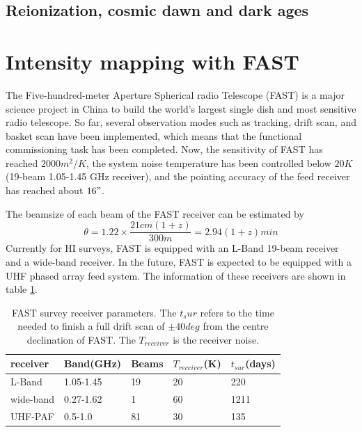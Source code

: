 \documentclass{article}
\begin{document}
\subsection{Reionization, cosmic dawn and dark ages}

\section{Intensity mapping with FAST}
The Five-hundred-meter Aperture Spherical radio Telescope (FAST) is a major science project in China to build the world's largest single dish and most sensitive radio telescope. So far, several observation modes such as tracking, drift scan, and basket scan have been implemented, which means that the functional commissioning task has been completed. Now, the sensitivity of FAST has reached $2000 m^2/K$, the system noise temperature has been controlled below $20K$ (19-beam 1.05-1.45 GHz receiver), and the pointing accuracy of the feed receiver has reached about $16"$. 

The beamsize of each beam of the FAST receiver can be estimated by
\begin{equation}
    \theta = 1.22\times \frac{21cm(1+z)}{300m}=2.94(1+z)min
\end{equation}
Currently for HI surveys, FAST is equipped with an L-Band 19-beam receiver and a wide-band receiver. In the future, FAST is expected to be equipped with a UHF phased array feed system. The information of these receivers are shown in table \ref{receiver}.
\begin{table}[H]
\centering
\begin{tabular}{l|llll}
\hline
receiver  & Band(GHz) & Beams & $T_{receiver}$(K) & $t_{sur}$(days) \\ \hline
L-Band    & 1.05-1.45 & 19    & 20                & 220             \\
wide-band & 0.27-1.62 & 1     & 60                & 1211            \\
UHF-PAF   & 0.5-1.0   & 81    & 30                & 135             \\ \hline
\end{tabular}
\caption{FAST survey receiver parameters. The $t_sur$ refers to the time needed
to finish a full drift scan of $\pm 40 deg$ from the centre declination of FAST.
The $T_{receiver}$ is the receiver noise.}
\label{receiver}
\end{table}
\end{document}
